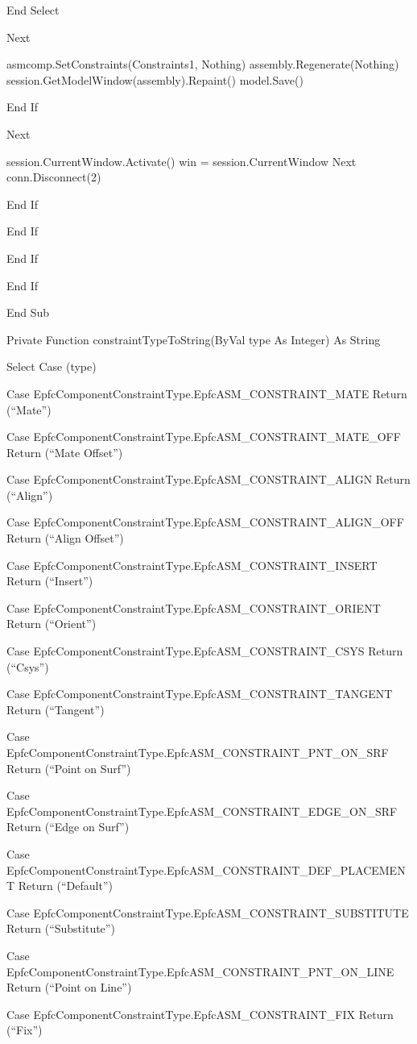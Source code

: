 \documentclass[]{article}
\begin{document}
End Select

Next

asmcomp.SetConstraints(Constraints1, Nothing)
assembly.Regenerate(Nothing) session.GetModelWindow(assembly).Repaint()
model.Save()

End If

Next

session.CurrentWindow.Activate() win = session.CurrentWindow Next
conn.Disconnect(2)

End If

End If

End If

End If

End Sub

Private Function constraintTypeToString(ByVal type As Integer) As String

Select Case (type)

Case EpfcComponentConstraintType.EpfcASM\_CONSTRAINT\_MATE Return
(``Mate'')

Case EpfcComponentConstraintType.EpfcASM\_CONSTRAINT\_MATE\_OFF Return
(``Mate Offset'')

Case EpfcComponentConstraintType.EpfcASM\_CONSTRAINT\_ALIGN Return
(``Align'')

Case EpfcComponentConstraintType.EpfcASM\_CONSTRAINT\_ALIGN\_OFF Return
(``Align Offset'')

Case EpfcComponentConstraintType.EpfcASM\_CONSTRAINT\_INSERT Return
(``Insert'')

Case EpfcComponentConstraintType.EpfcASM\_CONSTRAINT\_ORIENT Return
(``Orient'')

Case EpfcComponentConstraintType.EpfcASM\_CONSTRAINT\_CSYS Return
(``Csys'')

Case EpfcComponentConstraintType.EpfcASM\_CONSTRAINT\_TANGENT Return
(``Tangent'')

Case EpfcComponentConstraintType.EpfcASM\_CONSTRAINT\_PNT\_ON\_SRF
Return (``Point on Surf'')

Case EpfcComponentConstraintType.EpfcASM\_CONSTRAINT\_EDGE\_ON\_SRF
Return (``Edge on Surf'')

Case EpfcComponentConstraintType.EpfcASM\_CONSTRAINT\_DEF\_PLACEMENT
Return (``Default'')

Case EpfcComponentConstraintType.EpfcASM\_CONSTRAINT\_SUBSTITUTE Return
(``Substitute'')

Case EpfcComponentConstraintType.EpfcASM\_CONSTRAINT\_PNT\_ON\_LINE
Return (``Point on Line'')

Case EpfcComponentConstraintType.EpfcASM\_CONSTRAINT\_FIX Return
(``Fix'')
\end{document}
